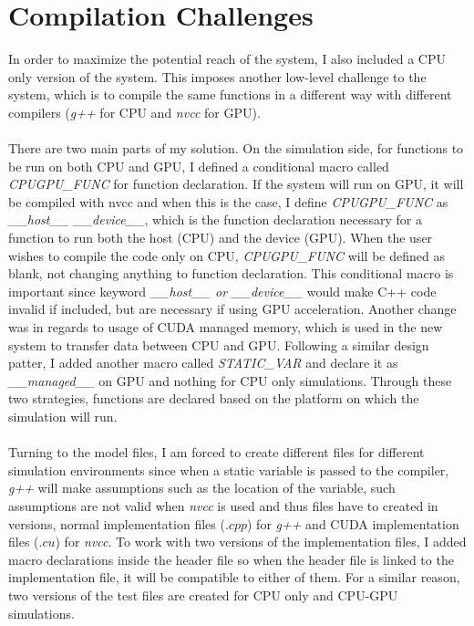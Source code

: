 \documentclass[../thesis.tex]{subfiles}
\begin{document}
\chapter{Compilation Challenges}
\label{ch:pruning}
In order to maximize the potential reach of the system, I also included a CPU only version of the system. This imposes another low-level challenge to the system, which is to compile the same functions in a different way with different compilers (\textit{g++} for CPU and \textit{nvcc} for GPU). \\
\\
There are two main parts of my solution. On the simulation side, for functions to be run on both CPU and GPU, I defined a conditional macro called \textit{CPUGPU\_FUNC} for function declaration. If the system will run on GPU, it will be compiled with nvcc and when this is the case, I define \textit{CPUGPU\_FUNC} as \textit{\_\_host\_\_ \_\_device\_\_}, which is the function declaration necessary for a function to run both the host (CPU) and the device (GPU). When the user wishes to compile the code only on CPU, \textit{CPUGPU\_FUNC} will be defined as blank, not changing anything to function declaration. This conditional macro is important since keyword \textit{\_\_host\_\_ or \_\_device\_\_} would make C++ code invalid if included, but are necessary if using GPU acceleration.
Another change was in regards to usage of CUDA managed memory, which is used in the new system to transfer data between CPU and GPU. Following a similar design patter, I added another macro called \textit{STATIC\_VAR} and declare it as \textit{\_\_managed\_\_} on GPU and nothing for CPU only simulations. Through these two strategies, functions are declared based on the platform on which the simulation will run. \\
\\
Turning to the model files, I am forced to create different files for different simulation environments since when a static variable is passed to the compiler, \textit{g++} will make assumptions such as the location of the variable, such assumptions are not valid when \textit{nvcc} is used and thus files have to created in versions, normal implementation files ($.cpp$) for \textit{g++} and CUDA implementation files ($.cu$) for \textit{nvcc}. To work with two versions of the implementation files, I added macro declarations inside the header file so when the header file is linked to the implementation file, it will be compatible to either of them. For a similar reason, two versions of the test files are created for CPU only and CPU-GPU simulations. \\
\end{document}
